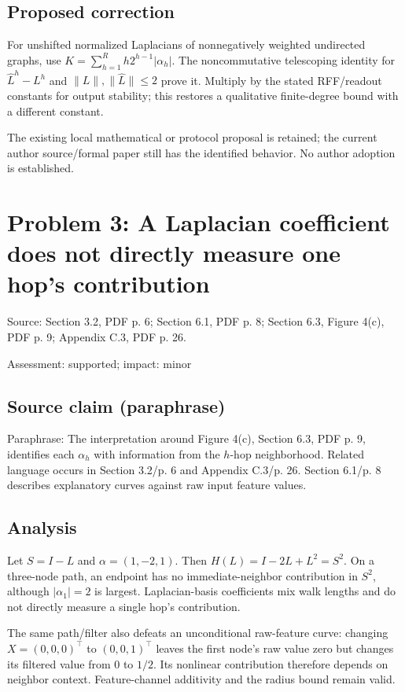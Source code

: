 \documentclass[11pt]{article}
\begin{document}
\subsection*{Proposed correction}

For unshifted normalized Laplacians of nonnegatively weighted undirected graphs, use \(K=\sum_{h=1}^R h2^{h-1}|\alpha_h|\). The noncommutative telescoping identity for \(\widehat L^h-L^h\) and \(\|L\|,\|\widehat L\|\le2\) prove it. Multiply by the stated RFF/readout constants for output stability; this restores a qualitative finite-degree bound with a different constant.

The existing local mathematical or protocol proposal is retained; the current author source/formal paper still has the identified behavior. No author adoption is established.

\section*{Problem 3: A Laplacian coefficient does not directly measure one hop’s contribution}

Source: Section 3.2, PDF p. 6; Section 6.1, PDF p. 8; Section 6.3, Figure 4(c), PDF p. 9; Appendix C.3, PDF p. 26.

Assessment: supported; impact: minor

\subsection*{Source claim (paraphrase)}

Paraphrase: The interpretation around Figure 4(c), Section 6.3, PDF p. 9, identifies each \(\alpha_h\) with information from the \(h\)-hop neighborhood. Related language occurs in Section 3.2/p. 6 and Appendix C.3/p. 26. Section 6.1/p. 8 describes explanatory curves against raw input feature values.

\subsection*{Analysis}

Let \(S=I-L\) and \(\alpha=(1,-2,1)\). Then \(H(L)=I-2L+L^2=S^2\). On a three-node path, an endpoint has no immediate-neighbor contribution in \(S^2\), although \(|\alpha_1|=2\) is largest. Laplacian-basis coefficients mix walk lengths and do not directly measure a single hop's contribution.

The same path/filter also defeats an unconditional raw-feature curve: changing \(X=(0,0,0)^\top\) to \((0,0,1)^\top\) leaves the first node’s raw value zero but changes its filtered value from \(0\) to \(1/2\). Its nonlinear contribution therefore depends on neighbor context. Feature-channel additivity and the radius bound remain valid.
\end{document}
